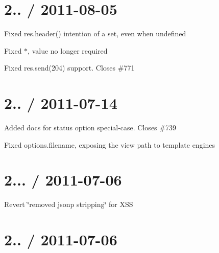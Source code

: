 {\ttfamily \section*{2.. / 2011-\/08-\/05 }}

{\ttfamily }

{\ttfamily 
\begin{DoxyItemize}
\item Fixed {\ttfamily res.\+header()} intention of a set, even when {\ttfamily undefined}
\item Fixed {\ttfamily $\ast$}, value no longer required
\item Fixed {\ttfamily res.\+send(204)} support. Closes \#771
\end{DoxyItemize}}

{\ttfamily \section*{2.. / 2011-\/07-\/14 }}

{\ttfamily }

{\ttfamily 
\begin{DoxyItemize}
\item Added docs for {\ttfamily status} option special-\/case. Closes \#739
\item Fixed {\ttfamily options.\+filename}, exposing the view path to template engines
\end{DoxyItemize}}

{\ttfamily \section*{2... / 2011-\/07-\/06 }}

{\ttfamily }

{\ttfamily 
\begin{DoxyItemize}
\item Revert \char`\"{}removed jsonp stripping\char`\"{} for X\+SS
\end{DoxyItemize}}

{\ttfamily \section*{2.. / 2011-\/07-\/06 }}

{\ttfamily }

